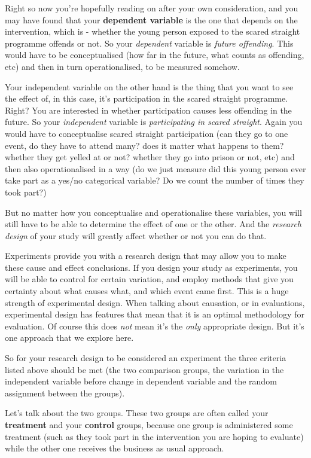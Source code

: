 \documentclass[
]{book}
\begin{document}
Right so now you're hopefully reading on after your own consideration, and you may have found that your \textbf{dependent variable} is the one that depends on the intervention, which is - whether the young person exposed to the scared straight programme offends or not. So your \emph{dependent} variable is \emph{future offending}. This would have to be conceptualised (how far in the future, what counts as offending, etc) and then in turn operationalised, to be measured somehow.

Your independent variable on the other hand is the thing that you want to see the effect of, in this case, it's participation in the scared straight programme. Right? You are interested in whether participation causes less offending in the future. So your \emph{independent} variable is \emph{participating in scared straight}. Again you would have to conceptualise scared straight participation (can they go to one event, do they have to attend many? does it matter what happens to them? whether they get yelled at or not? whether they go into prison or not, etc) and then also operationalised in a way (do we just measure did this young person ever take part as a yes/no categorical variable? Do we count the number of times they took part?)

But no matter how you conceptualise and operationalise these variables, you will still have to be able to determine the effect of one or the other. And the \emph{research design} of your study will greatly affect whether or not you can do that.

Experiments provide you with a research design that may allow you to make these cause and effect conclusions. If you design your study as experiments, you will be able to control for certain variation, and employ methods that give you certainty about what causes what, and which event came first. This is a huge strength of experimental design. When talking about causation, or in evaluations, experimental design has features that mean that it is an optimal methodology for evaluation. Of course this does \emph{not} mean it's the \emph{only} appropriate design. But it's one approach that we explore here.

So for your research design to be considered an experiment the three criteria listed above should be met (the two comparison groups, the variation in the independent variable before change in dependent variable and the random assignment between the groups).

Let's talk about the two groups. These two groups are often called your \textbf{treatment} and your \textbf{control} groups, because one group is administered some treatment (such as they took part in the intervention you are hoping to evaluate) while the other one receives the business as usual approach.
\end{document}
